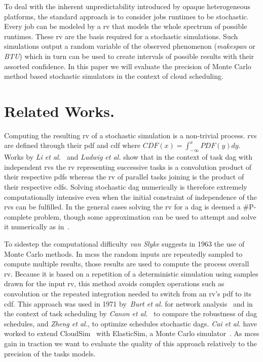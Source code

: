 \documentclass[10pt,conference,compsocconf]{IEEEtran}
\newcommand{\etal}[1]{\emph{#1 et al.}}
\begin{document}
To deal  with the inherent  unpredictability introduced by  opaque heterogeneous
platforms, the standard approach is to  consider jobs runtimes to be stochastic.
Every job can be modeled by a \ac{rv} that models the whole spectrum of possible
runtimes. These  \ac{rv} are  the basis required  for a  stochastic simulations.
Such  simulations   output  a  random   variable  of  the   observed  phenomenon
(\emph{makespan}  or  \emph{\ac{BTU}}) which  in  turn  can  be used  to  create
intervals of possible  results with their assorted confidence. In  this paper we
will evaluate the precision of Monte Carlo method based stochastic simulators in
the context of cloud scheduling.

\section{Related Works.}

Computing the resulting \ac{rv} of a stochastic simulation is a non-trivial
process.  \acp{rv} are defined through their \ac{pdf} and \ac{cdf} where $CDF(x)
= \int_{-\infty}^{x} PDF(y) dy$. Works by \etal{Li}~\cite{Li97} and
\etal{Ludwig}\cite{Ludwig01} show that in the context of task \ac{dag} with
independent \acp{rv} the \ac{rv} representing successive tasks is a convolution
product of their respective \acp{pdf} whereas the \ac{rv} of parallel tasks
joining is the product of their respective \acp{cdf}. Solving stochastic
\ac{dag} numerically is therefore extremely computationally intensive even when
the initial constraint of independence of the \acp{rv} can be fulfilled. In the
general cases solving the \ac{rv} for a \ac{dag} is deemed a \#P-complete
problem, though some approximation can be used to attempt and solve it
numerically as in~\cite{dodin85}.

To sidestep the computational difficulty \emph{van Slyke} suggests in
1963\cite{Slyke63} the use of Monte Carlo methods. In \acp{mcs} the random
inputs are repeatedly sampled to compute multiple results, those results are
used to compute the process overall \acl{rv}. Because it is based on a
repetition of a deterministic simulation using samples drawn for the input
\ac{rv}, this method avoids complex operations such as convolution or the
repeated integration needed to switch from an \ac{rv}'s \ac{pdf} to its
\ac{cdf}. This approach was used in 1971 by~\etal{Burt} for network
analysis~\cite{burt71} and in the context of task scheduling by
\etal{Canon}~\cite{Canon10} to compare the robustness of \ac{dag} schedules, and
\etal{Zheng}, to optimize schedules stochastic \acp{dag}. \etal{Cai} have worked
to extend CloudSim~\cite{cloudsim} with ElasticSim, a Monte Carlo
simulator~\cite{cai16}. As \acp{mcs} gain in traction we want to
evaluate the quality of this approach relatively to the precision of the tasks
models.
\end{document}
